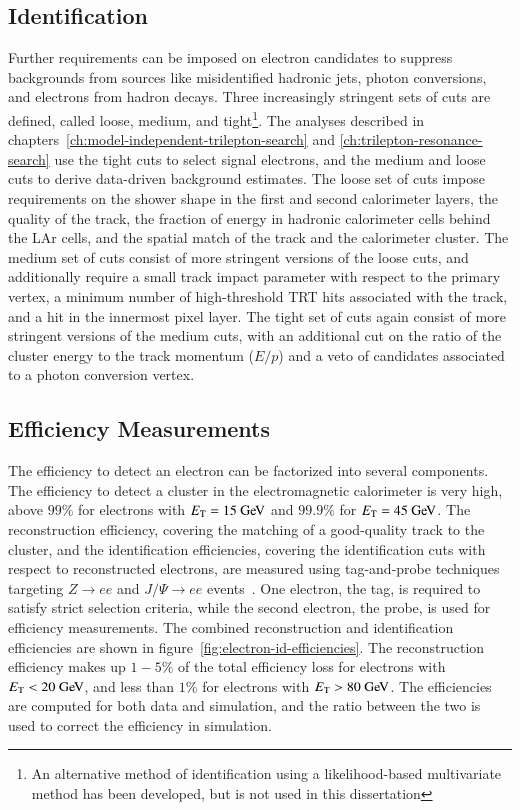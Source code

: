 \subsection{Identification}
Further requirements can be imposed on electron candidates to suppress backgrounds from sources like misidentified hadronic jets, photon conversions, and electrons from hadron decays. Three increasingly stringent sets of cuts are defined, called loose, medium, and tight\footnote{An alternative method of identification using a likelihood-based multivariate method has been developed, but is not used in this dissertation}. The analyses described in chapters~\ref{ch:model-independent-trilepton-search} and \ref{ch:trilepton-resonance-search} use the tight cuts to select signal electrons, and the medium and loose cuts to derive data-driven background estimates. The loose set of cuts impose requirements on the shower shape in the first and second calorimeter layers, the quality of the track, the fraction of energy in hadronic calorimeter cells behind the LAr cells, and the spatial match of the track and the calorimeter cluster. The medium set of cuts consist of more stringent versions of the loose cuts, and additionally require a small track impact parameter with respect to the primary vertex, a minimum number of high-threshold TRT hits associated with the track, and a hit in the innermost pixel layer. The tight set of cuts again consist of more stringent versions of the medium cuts, with an additional cut on the ratio of the cluster energy to the track momentum ($E/p$) and a veto of candidates associated to a photon conversion vertex. 


\subsection{Efficiency Measurements}\label{sec:reco-electron-efficiency}
The efficiency to detect an electron can be factorized into several components. The efficiency to detect a cluster in the electromagnetic calorimeter is very high, above $99\%$ for electrons with $\Et=15 \GeV$ and $99.9\%$ for $\Et=45 \GeV$. The reconstruction efficiency, covering the matching of a good-quality track to the cluster, and the identification efficiencies, covering the identification cuts with respect to reconstructed electrons, are measured using tag-and-probe techniques targeting $Z\rightarrow ee$ and $J/\Psi\rightarrow ee$ events~\cite{TheATLASCollaboration:2014vz}. One electron, the tag, is required to satisfy strict selection criteria, while the second electron, the probe, is used for efficiency measurements. The combined reconstruction and identification efficiencies are shown in figure~\ref{fig:electron-id-efficiencies}. The reconstruction efficiency makes up $1-5\%$ of the total efficiency loss for electrons with $\Et<20 \GeV$, and less than $1\%$ for electrons with $\Et>80 \GeV$. The efficiencies are computed for both data and simulation, and the ratio between the two is used to correct the efficiency in simulation.

